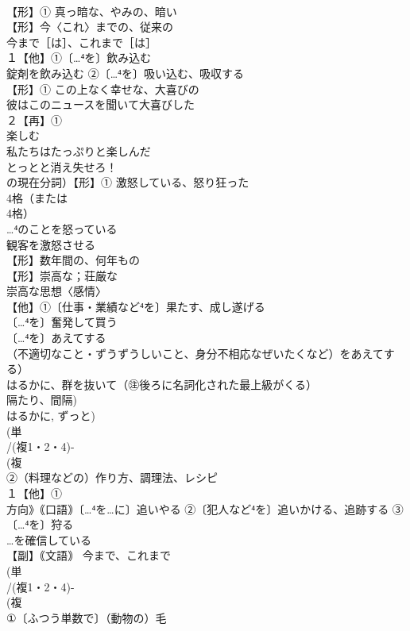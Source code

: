 \documentclass[8pt]{extreport}
\begin{document}
\begin{CJK}{UTF8}{min}
\\	【形】① 真っ暗な、やみの、暗い
\\	【形】今〈これ〉までの、従来の 
\\	今まで［は］、これまで［は］
\\	１【他】①〔…⁴を〕飲み込む 
\\	錠剤を飲み込む ②〔…⁴を〕吸い込む、吸収する
\\	【形】① この上なく幸せな、大喜びの 
\\	彼はこのニュースを聞いて大喜びした 
\\	２【再】①
\\	楽しむ 
\\	私たちはたっぷりと楽しんだ 
\\	とっとと消え失せろ！
\\	の現在分詞）【形】① 激怒している、怒り狂った 
\\	4格（または
\\	4格）
\\	…⁴のことを怒っている 
\\	観客を激怒させる
\\	【形】数年間の、何年もの
\\	【形】崇高な；荘厳な 
\\	崇高な思想〈感情〉
\\	【他】①〔仕事・業績など⁴を〕果たす、成し遂げる 
\\	〔…⁴を〕奮発して買う 
\\	〔…⁴を〕あえてする 
\\	（不適切なこと・ずうずうしいこと、身分不相応なぜいたくなど）をあえてする）
\\	はるかに、群を抜いて（㊟後ろに名詞化された最上級がくる） 
\\	隔たり、間隔) 
\\	はるかに, ずっと)
\\	(単
\\	/(複1・2・4)-
\\	(複
\\	②（料理などの）作り方、調理法、レシピ 
\\	１【他】①
\\	方向》｟口語｠〔…⁴を…に〕追いやる ②〔犯人など⁴を〕追いかける、追跡する ③〔…⁴を〕狩る
\\	…を確信している
\\	【副】｟文語｠ 今まで、これまで
\\	(単
\\	/(複1・2・4)-
\\	(複
\\	①〔ふつう単数で〕（動物の）毛 

\end{CJK}
\end{document}
